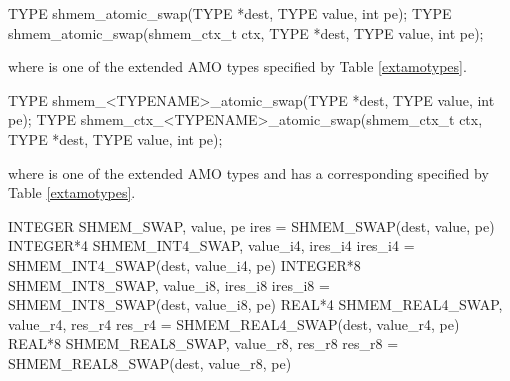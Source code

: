 
\begin{apidefinition}

\begin{C11synopsis}
TYPE shmem_atomic_swap(TYPE *dest, TYPE value, int pe);
TYPE shmem_atomic_swap(shmem_ctx_t ctx, TYPE *dest, TYPE value, int pe);
\end{C11synopsis}
where \TYPE{} is one of the extended \ac{AMO} types specified by Table \ref{extamotypes}.

\begin{Csynopsis}
TYPE shmem_<TYPENAME>_atomic_swap(TYPE *dest, TYPE value, int pe);
TYPE shmem_ctx_<TYPENAME>_atomic_swap(shmem_ctx_t ctx, TYPE *dest, TYPE value, int pe);
\end{Csynopsis}
where \TYPE{} is one of the extended \ac{AMO} types and has a corresponding \TYPENAME{} specified by Table \ref{extamotypes}.

\begin{Fsynopsis}
INTEGER SHMEM_SWAP, value, pe
ires = SHMEM_SWAP(dest, value, pe)
INTEGER*4 SHMEM_INT4_SWAP, value_i4, ires_i4
ires_i4 = SHMEM_INT4_SWAP(dest, value_i4, pe)
INTEGER*8 SHMEM_INT8_SWAP, value_i8, ires_i8
ires_i8 = SHMEM_INT8_SWAP(dest, value_i8, pe)
REAL*4 SHMEM_REAL4_SWAP, value_r4, res_r4
res_r4 = SHMEM_REAL4_SWAP(dest, value_r4, pe)
REAL*8 SHMEM_REAL8_SWAP, value_r8, res_r8
res_r8 = SHMEM_REAL8_SWAP(dest, value_r8, pe)
\end{Fsynopsis}

\begin{apiarguments}
\end{apiarguments}



\end{apidefinition}
